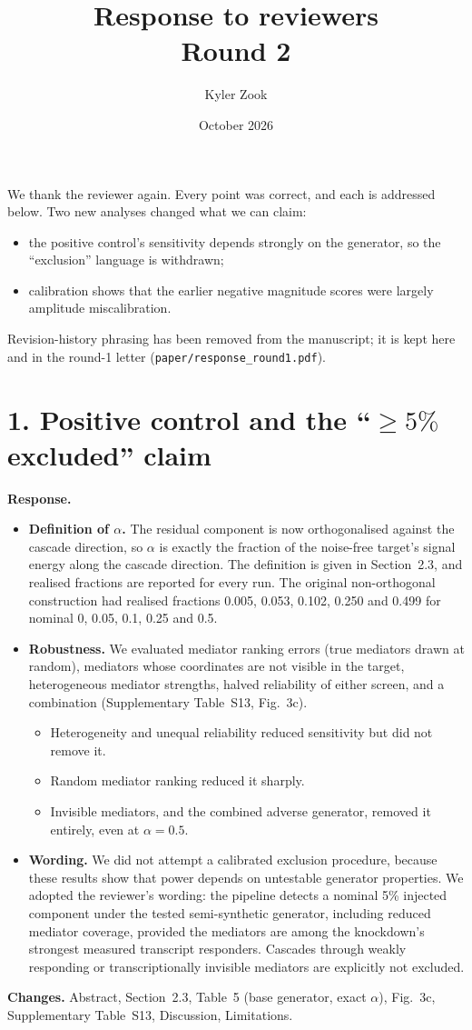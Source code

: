 \documentclass[10pt]{article}
\title{\textbf{Response to reviewers}\\\large Round 2}
\author{Kyler Zook}
\date{October 2026}
\newcommand{\resp}{\par\smallskip\noindent\textbf{Response.} }
\newcommand{\chg}{\par\smallskip\noindent\textbf{Changes.} }
\begin{document}
\maketitle

We thank the reviewer again. Every point was correct, and each is addressed below. Two new analyses changed what we can claim:
\begin{itemize}
\item the positive control's sensitivity depends strongly on the generator, so the ``exclusion'' language is withdrawn;
\item calibration shows that the earlier negative magnitude scores were largely amplitude miscalibration.
\end{itemize}
Revision-history phrasing has been removed from the manuscript; it is kept here and in the round-1 letter (\texttt{paper/response\_round1.pdf}).

\section*{1. Positive control and the ``$\ge5\%$ excluded'' claim}
\resp
\begin{itemize}
\item \textbf{Definition of $\alpha$.} The residual component is now orthogonalised against the cascade direction, so $\alpha$ is exactly the fraction of the noise-free target's signal energy along the cascade direction. The definition is given in Section~2.3, and realised fractions are reported for every run. The original non-orthogonal construction had realised fractions 0.005, 0.053, 0.102, 0.250 and 0.499 for nominal 0, 0.05, 0.1, 0.25 and 0.5.
\item \textbf{Robustness.} We evaluated mediator ranking errors (true mediators drawn at random), mediators whose coordinates are not visible in the target, heterogeneous mediator strengths, halved reliability of either screen, and a combination (Supplementary Table~S13, Fig.~3c).
\begin{itemize}
\item Heterogeneity and unequal reliability reduced sensitivity but did not remove it.
\item Random mediator ranking reduced it sharply.
\item Invisible mediators, and the combined adverse generator, removed it entirely, even at $\alpha=0.5$.
\end{itemize}
\item \textbf{Wording.} We did not attempt a calibrated exclusion procedure, because these results show that power depends on untestable generator properties. We adopted the reviewer's wording: the pipeline detects a nominal 5\% injected component under the tested semi-synthetic generator, including reduced mediator coverage, provided the mediators are among the knockdown's strongest measured transcript responders. Cascades through weakly responding or transcriptionally invisible mediators are explicitly not excluded.
\end{itemize}
\chg Abstract, Section~2.3, Table~5 (base generator, exact $\alpha$), Fig.~3c, Supplementary Table~S13, Discussion, Limitations.
\end{document}
